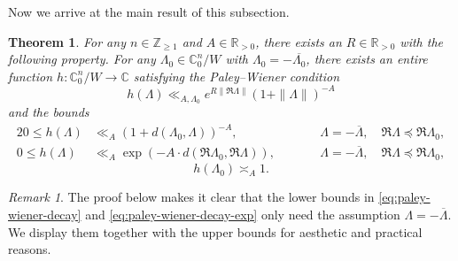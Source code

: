\documentclass[11pt,oneside]{amsart}
\numberwithin{equation}{section}
\theoremstyle{remark}
\newtheorem{remark}{Remark}
\theoremstyle{plain}
\newtheorem{theorem}{Theorem}
\newcommand\ZZ{\mathbb{Z}}
\newcommand\RR{\mathbb{R}}
\newcommand\CC{\mathbb{C}}
\newcommand\ov{\overline}
\renewcommand\leq{\leqslant}
\renewcommand\geq{\geqslant}
\begin{document}
Now we arrive at the main result of this subsection. 

\begin{theorem}\label{theorem:concrete-paley-wiener-function} For any $n\in\ZZ_{\geq 1}$ and $A\in\RR_{>0}$, there exists an $R\in\RR_{>0}$ with the following property. For any $\Lambda_0\in\CC^n_0/W$ with $\Lambda_0=-\ov{\Lambda_0}$, there exists an entire function $h:\CC^n_0/W\to\CC$ satisfying the Paley--Wiener condition
\begin{equation}\label{eq:paley-wiener-growth-condition}
h(\Lambda)\ll_{A,\Lambda_0} e^{R\|\Re\Lambda\|} (1+\|\Lambda\|)^{-A}
\end{equation}
and the bounds
\begin{alignat}{2}
\label{eq:paley-wiener-decay}
0\leq h(\Lambda)&\ll_A (1+d(\Lambda_0,\Lambda))^{-A},&&\qquad\Lambda=-\ov{\Lambda},\quad\Re\Lambda\preceq\Re\Lambda_0,\\
\label{eq:paley-wiener-decay-exp}
0\leq h(\Lambda)&\ll_A \exp(-A\cdot d(\Re\Lambda_0,\Re\Lambda)),&&\qquad\Lambda=-\ov{\Lambda},\quad\Re\Lambda\preceq\Re\Lambda_0,
\end{alignat}
\begin{equation}\label{eq:paley-wiener-pi-amplified}
h(\Lambda_0)\asymp_{A} 1.
\end{equation}
\end{theorem}

\begin{remark} The proof below makes it clear that the lower bounds in \eqref{eq:paley-wiener-decay}
and \eqref{eq:paley-wiener-decay-exp} only need the assumption $\Lambda=-\ov{\Lambda}$. We display them together with the upper bounds for aesthetic and practical reasons.
\end{remark}
\end{document}
